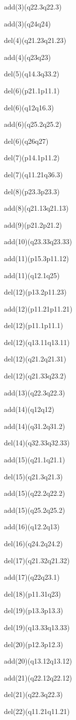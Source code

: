 \documentclass[]{article}
\begin{document}
add(3)(q22.3q22.3)

add(3)(q24q24)

del(4)(q21.23q21.23)

add(4)(q23q23)

del(5)(q14.3q33.2)

del(6)(p21.1p11.1)

del(6)(q12q16.3)

add(6)(q25.2q25.2)

del(6)(q26q27)

del(7)(p14.1p11.2)

del(7)(q11.21q36.3)

del(8)(p23.3p23.3)

add(8)(q21.13q21.13)

add(9)(p21.2p21.2)

add(10)(q23.33q23.33)

add(11)(p15.3p11.12)

add(11)(q12.1q25)

del(12)(p13.2p11.23)

add(12)(p11.21p11.21)

del(12)(p11.1p11.1)

del(12)(q13.11q13.11)

del(12)(q21.2q21.31)

del(12)(q21.33q23.2)

add(13)(q22.3q22.3)

add(14)(q12q12)

add(14)(q31.2q31.2)

del(14)(q32.33q32.33)

add(15)(q21.1q21.1)

del(15)(q21.3q21.3)

add(15)(q22.2q22.2)

add(15)(q25.2q25.2)

add(16)(q12.2q13)

del(16)(q24.2q24.2)

del(17)(q21.32q21.32)

add(17)(q22q23.1)

del(18)(p11.31q23)

del(19)(p13.3p13.3)

del(19)(q13.33q13.33)

del(20)(p12.3p12.3)

add(20)(q13.12q13.12)

add(21)(q22.12q22.12)

del(21)(q22.3q22.3)

del(22)(q11.21q11.21)
\end{document}
